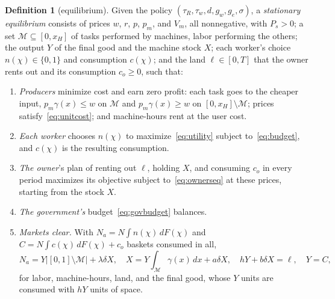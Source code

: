 \documentclass[12pt]{article}
\theoremstyle{plain}
\theoremstyle{definition}
\newtheorem{definition}{Definition}
\theoremstyle{remark}
\begin{document}
\begin{definition}[equilibrium]\label{def:equilibrium}
Given the policy $(\tau_R,\tau_w,d,g_w,g_e,\sigma)$, a \emph{stationary equilibrium} consists of prices $w$, $r$, $p$, $p_m$, and $V_m$, all nonnegative, with $P_s>0$; a set $\mathcal M\subseteq[0,x_H]$ of tasks performed by machines, labor performing the others; the output $Y$ of the final good and the machine stock $X$; each worker's choice $n(\chi)\in\{0,1\}$ and consumption $c(\chi)$; and the land $\ell\in[0,T]$ that the owner rents out and its consumption $c_o\ge0$, such that:
\begin{enumerate}
\item[(i)] \emph{Producers} minimize cost and earn zero profit: each task goes to the cheaper input, $p_m\gamma(x)\le w$ on $\mathcal M$ and $p_m\gamma(x)\ge w$ on $[0,x_H]\setminus\mathcal M$; prices satisfy~\eqref{eq:unitcost}; and machine-hours rent at the user cost.
\item[(ii)] \emph{Each worker} chooses $n(\chi)$ to maximize~\eqref{eq:utility} subject to~\eqref{eq:budget}, and $c(\chi)$ is the resulting consumption.
\item[(iii)] \emph{The owner}'s plan of renting out $\ell$, holding $X$, and consuming $c_o$ in every period maximizes its objective subject to~\eqref{eq:ownerseq} at these prices, starting from the stock $X$.
\item[(iv)] \emph{The government's} budget~\eqref{eq:govbudget} balances.
\item[(v)] \emph{Markets clear.} With $N_a=N\int n(\chi)\,dF(\chi)$ and $C=N\int c(\chi)\,dF(\chi)+c_o$ baskets consumed in all,
\[
N_a=Y\bigl|[0,1]\setminus\mathcal M\bigr|+\lambda\delta X,\quad
X=Y\!\int_{\mathcal M}\gamma(x)\,dx+a\delta X,\quad
hY+b\delta X=\ell,\quad
Y=C,
\]
for labor, machine-hours, land, and the final good, whose $Y$ units are consumed with $hY$ units of space.
\end{enumerate}
\end{definition}
\end{document}
